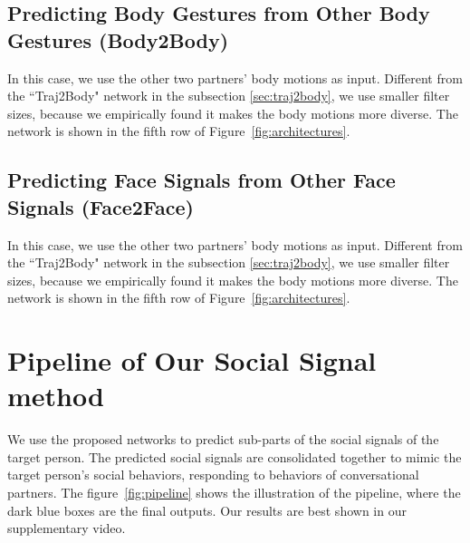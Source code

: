 \subsection{Predicting Body Gestures from Other Body Gestures (Body2Body)}

In this case, we use the other two partners' body motions as input. Different from the ``Traj2Body" network in the subsection \ref{sec:traj2body}, we use smaller filter sizes, because we empirically found it makes the body motions more diverse. The network is shown in the fifth row of Figure~\ref{fig:architectures}.

\subsection{Predicting Face Signals from Other Face Signals (Face2Face)}

In this case, we use the other two partners' body motions as input. Different from the ``Traj2Body" network in the subsection \ref{sec:traj2body}, we use smaller filter sizes, because we empirically found it makes the body motions more diverse. The network is shown in the fifth row of Figure~\ref{fig:architectures}.


\section{Pipeline of Our Social Signal method}
We use the proposed networks to predict sub-parts of the social signals of the target person. The predicted social signals are consolidated together to mimic the target person's social behaviors, responding to behaviors of conversational partners. The figure~\ref{fig:pipeline} shows the illustration of the pipeline, where the dark blue boxes are the final outputs. Our results are best shown in our supplementary video. 
